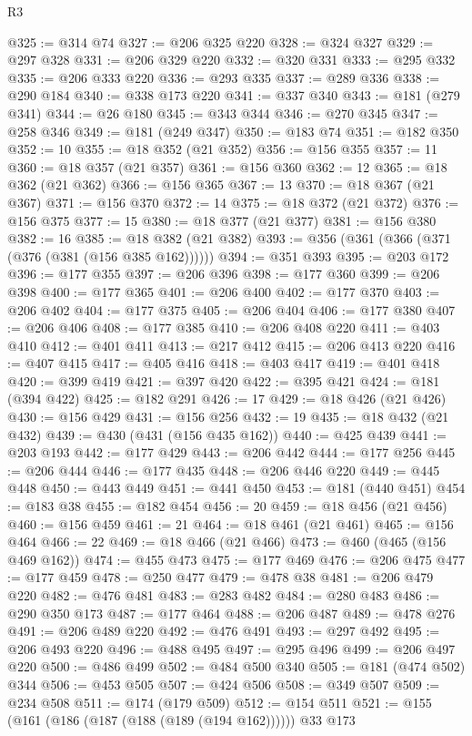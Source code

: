 \begin{lexlean}{R3}
\begin{coremodule}
@325 := @314 @74
@327 := @206 @325 @220
@328 := @324 @327
@329 := @297 @328
@331 := @206 @329 @220
@332 := @320 @331
@333 := @295 @332
@335 := @206 @333 @220
@336 := @293 @335
@337 := @289 @336
@338 := @290 @184
@340 := @338 @173 @220
@341 := @337 @340
@343 := @181 (@279 @341)
@344 := @26 @180
@345 := @343 @344
@346 := @270 @345
@347 := @258 @346
@349 := @181 (@249 @347)
@350 := @183 @74
@351 := @182 @350
@352 := 10
@355 := @18 @352 (@21 @352)
@356 := @156 @355
@357 := 11
@360 := @18 @357 (@21 @357)
@361 := @156 @360
@362 := 12
@365 := @18 @362 (@21 @362)
@366 := @156 @365
@367 := 13
@370 := @18 @367 (@21 @367)
@371 := @156 @370
@372 := 14
@375 := @18 @372 (@21 @372)
@376 := @156 @375
@377 := 15
@380 := @18 @377 (@21 @377)
@381 := @156 @380
@382 := 16
@385 := @18 @382 (@21 @382)
@393 := @356 (@361 (@366 (@371 (@376 (@381 (@156 @385 @162))))))
@394 := @351 @393
@395 := @203 @172
@396 := @177 @355
@397 := @206 @396
@398 := @177 @360
@399 := @206 @398
@400 := @177 @365
@401 := @206 @400
@402 := @177 @370
@403 := @206 @402
@404 := @177 @375
@405 := @206 @404
@406 := @177 @380
@407 := @206 @406
@408 := @177 @385
@410 := @206 @408 @220
@411 := @403 @410
@412 := @401 @411
@413 := @217 @412
@415 := @206 @413 @220
@416 := @407 @415
@417 := @405 @416
@418 := @403 @417
@419 := @401 @418
@420 := @399 @419
@421 := @397 @420
@422 := @395 @421
@424 := @181 (@394 @422)
@425 := @182 @291
@426 := 17
@429 := @18 @426 (@21 @426)
@430 := @156 @429
@431 := @156 @256
@432 := 19
@435 := @18 @432 (@21 @432)
@439 := @430 (@431 (@156 @435 @162))
@440 := @425 @439
@441 := @203 @193
@442 := @177 @429
@443 := @206 @442
@444 := @177 @256
@445 := @206 @444
@446 := @177 @435
@448 := @206 @446 @220
@449 := @445 @448
@450 := @443 @449
@451 := @441 @450
@453 := @181 (@440 @451)
@454 := @183 @38
@455 := @182 @454
@456 := 20
@459 := @18 @456 (@21 @456)
@460 := @156 @459
@461 := 21
@464 := @18 @461 (@21 @461)
@465 := @156 @464
@466 := 22
@469 := @18 @466 (@21 @466)
@473 := @460 (@465 (@156 @469 @162))
@474 := @455 @473
@475 := @177 @469
@476 := @206 @475
@477 := @177 @459
@478 := @250 @477
@479 := @478 @38
@481 := @206 @479 @220
@482 := @476 @481
@483 := @283 @482
@484 := @280 @483
@486 := @290 @350 @173
@487 := @177 @464
@488 := @206 @487
@489 := @478 @276
@491 := @206 @489 @220
@492 := @476 @491
@493 := @297 @492
@495 := @206 @493 @220
@496 := @488 @495
@497 := @295 @496
@499 := @206 @497 @220
@500 := @486 @499
@502 := @484 @500 @340
@505 := @181 (@474 @502) @344
@506 := @453 @505
@507 := @424 @506
@508 := @349 @507
@509 := @234 @508
@511 := @174 (@179 @509)
@512 := @154 @511
@521 := @155 (@161 (@186 (@187 (@188 (@189 (@194 @162)))))) @33 @173

\end{coremodule}
\end{lexlean}
